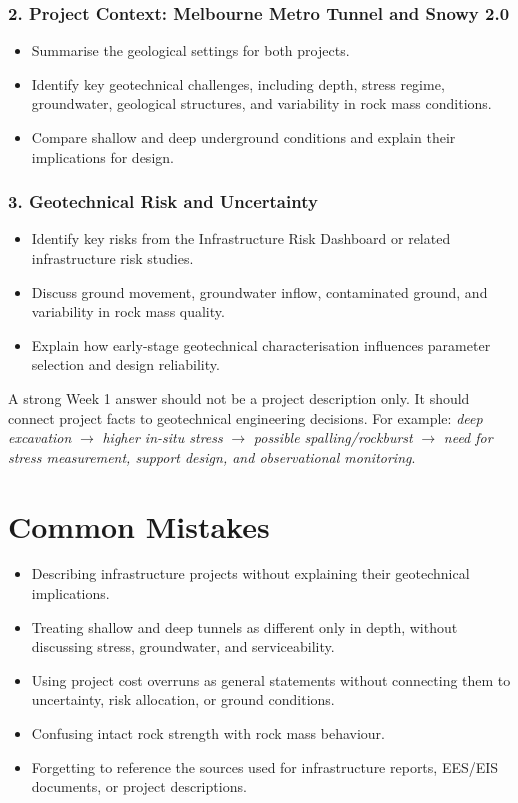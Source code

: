 \documentclass[a4paper,12pt]{article}
\begin{document}
\subsubsection*{2. Project Context: Melbourne Metro Tunnel and Snowy 2.0}
\begin{itemize}
    \item Summarise the geological settings for both projects.
    \item Identify key geotechnical challenges, including depth, stress regime, groundwater, geological structures, and variability in rock mass conditions.
    \item Compare shallow and deep underground conditions and explain their implications for design.
\end{itemize}

\subsubsection*{3. Geotechnical Risk and Uncertainty}
\begin{itemize}
    \item Identify key risks from the Infrastructure Risk Dashboard or related infrastructure risk studies.
    \item Discuss ground movement, groundwater inflow, contaminated ground, and variability in rock mass quality.
    \item Explain how early-stage geotechnical characterisation influences parameter selection and design reliability.
\end{itemize}

\begin{notebox}
A strong Week 1 answer should not be a project description only. It should connect project facts to geotechnical engineering decisions. For example: \textit{deep excavation} $\rightarrow$ \textit{higher in-situ stress} $\rightarrow$ \textit{possible spalling/rockburst} $\rightarrow$ \textit{need for stress measurement, support design, and observational monitoring}.
\end{notebox}

\section{Common Mistakes}
\begin{itemize}
    \item Describing infrastructure projects without explaining their geotechnical implications.
    \item Treating shallow and deep tunnels as different only in depth, without discussing stress, groundwater, and serviceability.
    \item Using project cost overruns as general statements without connecting them to uncertainty, risk allocation, or ground conditions.
    \item Confusing intact rock strength with rock mass behaviour.
    \item Forgetting to reference the sources used for infrastructure reports, EES/EIS documents, or project descriptions.
\end{itemize}
\end{document}
